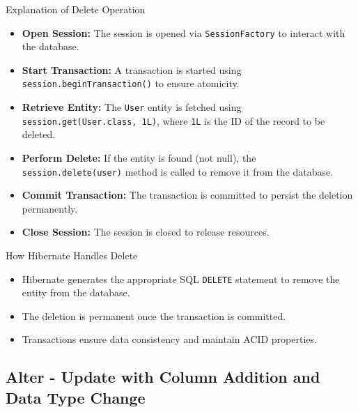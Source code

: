 \documentclass[aspectratio=169, table]{beamer}
\begin{document}
\begin{frame}{Explanation of Delete Operation}
	\vspace{20pt}
	\begin{itemize}
		\item \textbf{Open Session:} The session is opened via \texttt{SessionFactory} to interact with the database.
		\item \textbf{Start Transaction:} A transaction is started using \texttt{session.beginTransaction()} to ensure atomicity.
		\item \textbf{Retrieve Entity:} The \texttt{User} entity is fetched using \texttt{session.get(User.class, 1L)}, where \texttt{1L} is the ID of the record to be deleted.
		\item \textbf{Perform Delete:} If the entity is found (not null), the \texttt{session.delete(user)} method is called to remove it from the database.
		\item \textbf{Commit Transaction:} The transaction is committed to persist the deletion permanently.
		\item \textbf{Close Session:} The session is closed to release resources.
	\end{itemize}
\end{frame}

\begin{frame}{How Hibernate Handles Delete}
	\vspace{20pt}
	\begin{itemize}
		\item Hibernate generates the appropriate SQL \texttt{DELETE} statement to remove the entity from the database.
		\item The deletion is permanent once the transaction is committed.
		\item Transactions ensure data consistency and maintain ACID properties.
	\end{itemize}
\end{frame}

\subsection{Alter - Update with Column Addition and Data Type Change}
\end{document}
